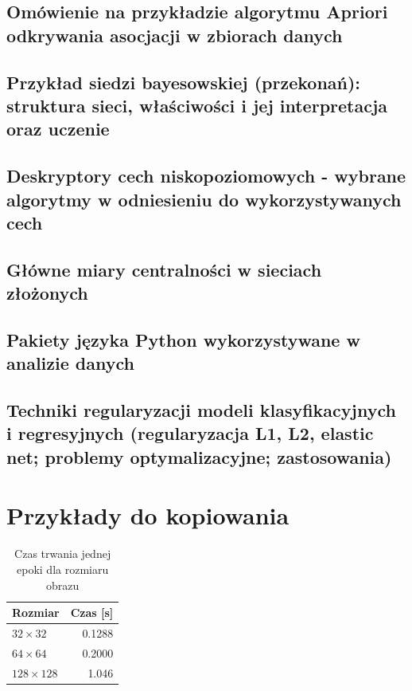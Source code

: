 \documentclass[wi]{zut}
\begin{document}
\subsection{Omówienie na przykładzie algorytmu Apriori odkrywania asocjacji w zbiorach danych}

\subsection{Przykład siedzi bayesowskiej (przekonań): struktura sieci, właściwości i jej interpretacja oraz uczenie}

\subsection{Deskryptory cech niskopoziomowych - wybrane algorytmy w odniesieniu do wykorzystywanych cech}

\subsection{Główne miary centralności w sieciach złożonych}

\subsection{Pakiety języka Python wykorzystywane w analizie danych}

\subsection{Techniki regularyzacji modeli klasyfikacyjnych i regresyjnych (regularyzacja L1, L2, elastic net; problemy optymalizacyjne; zastosowania)}


\printbibliography[heading=bibintoc]

\appendix

\section{Przykłady do kopiowania}

\begin{table}[H]
\caption{Czas trwania jednej epoki dla rozmiaru obrazu}
\vspace{1em}
\centering
\begin{tabular}{@{}lr@{}}
\toprule
Rozmiar          & Czas {[}s{]} \\ \midrule
$32 \times 32$   & 0.1288       \\
$64 \times 64$   & 0.2000       \\
$128 \times 128$ & 1.046        \\ \bottomrule
\end{tabular}
\end{table}
\end{document}
